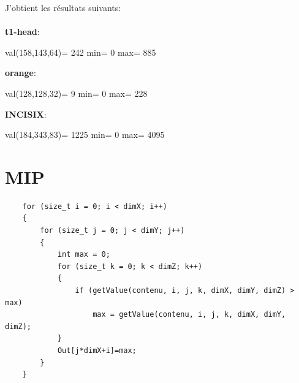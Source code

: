 \documentclass{article}
\begin{document}
\newpage
J'obtient les résultats suivants:
\\\\

\textbf{t1-head}:

val(158,143,64)= 242
min= 0
max= 885

\textbf{orange}:

val(128,128,32)= 9
min= 0
max= 228


\textbf{INCISIX}:

val(184,343,83)= 1225
min= 0
max= 4095

\newpage
\section{MIP}

\begin{lstlisting}
    for (size_t i = 0; i < dimX; i++)
    {
        for (size_t j = 0; j < dimY; j++)
        {
            int max = 0;
            for (size_t k = 0; k < dimZ; k++)
            {
                if (getValue(contenu, i, j, k, dimX, dimY, dimZ) > max)
                    max = getValue(contenu, i, j, k, dimX, dimY, dimZ);
            }
            Out[j*dimX+i]=max;
        }
    }
\end{lstlisting}
\end{document}

